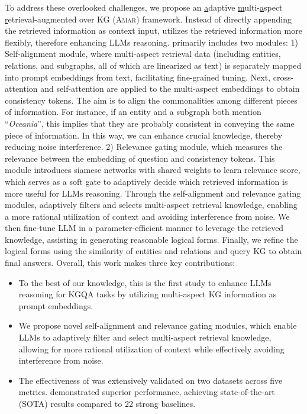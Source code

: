 To address these overlooked challenges, we propose an \underline{a}daptive \underline{m}ulti-\underline{a}spect \underline{r}etrieval-augmented over KG (\textsc{Amar}) framework. Instead of directly appending the retrieved information as context input, \model utilizes the retrieved information more flexibly, therefore enhancing LLMs reasoning.
\model primarily includes two modules:
 1) Self-alignment module, where multi-aspect retrieval data (including entities, relations, and subgraphs, all of which are linearized as text) is separately mapped into prompt embeddings from text, facilitating fine-grained tuning. Next, cross-attention and self-attention are applied to the multi-aspect embeddings to obtain consistency tokens. The aim is to align the commonalities among different pieces of information. For instance, if an entity and a subgraph both mention ``\textit{Oceania}'', this implies that they are probably consistent in conveying the same piece of information. In this way, we can enhance crucial knowledge, thereby reducing noise interference.
 2) Relevance gating module, which measures the relevance between the embedding of question and consistency tokens. This module introduces siamese networks with shared weights to learn relevance score, which serves as a soft gate to adaptively decide which retrieved information is more useful for LLMs reasoning.
Through the self-alignment and relevance gating modules, \model adaptively filters and selects multi-aspect retrieval knowledge, enabling a more rational utilization of context and avoiding interference from noise. We then fine-tune LLM in a parameter-efficient manner to leverage the retrieved knowledge, assisting in generating reasonable logical forms. Finally, we refine the logical forms using the similarity of entities and relations and query KG to obtain final answers.
Overall, this work makes three key contributions:
\begin{itemize}%
    \item To the best of our knowledge, this is the first study to enhance LLMs reasoning for KGQA tasks by utilizing multi-aspect KG information as prompt embeddings. 
    \item  We propose novel self-alignment and relevance gating modules, which enable LLMs to adaptively filter and select multi-aspect retrieval knowledge, allowing for more rational utilization of context while effectively avoiding interference from noise.
    \item The effectiveness of \model was extensively validated on two datasets across five metrics. \model demonstrated superior performance, achieving state-of-the-art (SOTA) results compared to 22 strong baselines.
\end{itemize}

